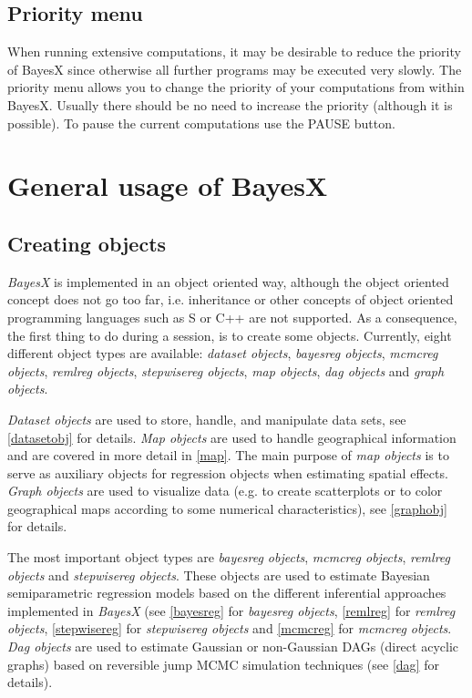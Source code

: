 \subsection{Priority menu}
\label{prioritymenu} 

When running extensive computations, it may be desirable to reduce the priority of BayesX since otherwise all further programs
may be executed very slowly. The priority menu allows you to change the priority of your computations from within BayesX.
Usually there should be no need to increase the priority (although it is possible). To pause the current computations use the
PAUSE button.

\section{General usage of BayesX}
\label{generalusage}

\subsection{Creating objects}
\label{createobject}  

{\em BayesX} is implemented in an object oriented way, although the object oriented concept does not go too far, i.e.
inheritance or other concepts of object oriented programming languages such as S or C++ are not supported. As a consequence,
the first thing to do during a session, is to create some objects. Currently, eight different object types are available: {\em
dataset objects}, {\em bayesreg objects}, {\em mcmcreg objects}, {\em remlreg objects}, {\em stepwisereg objects}, {\em map objects}, {\em dag objects} and {\em graph objects}.

{\em Dataset objects} are used to store, handle, and manipulate data sets, see \autoref{datasetobj} for details. {\em Map
objects} are used to handle geographical information and are covered in more detail in \autoref{map}. The main purpose of {\em
map objects} is to serve as auxiliary objects for regression objects when estimating spatial
effects. {\em Graph objects} are used to visualize data (e.g. to create scatterplots or to color geographical maps according to
some numerical characteristics), see \autoref{graphobj} for details. 

The most important object types are {\em bayesreg objects}, {\em mcmcreg objects}, {\em remlreg objects} and {\em stepwisereg objects}. These objects are used to estimate Bayesian semiparametric regression models based on the different inferential approaches implemented in {\em BayesX} (see \autoref{bayesreg} for {\em bayesreg objects}, \autoref{remlreg} for {\em remlreg objects}, \autoref{stepwisereg} for {\em stepwisereg objects} and \autoref{mcmcreg} for {\em mcmcreg objects}. {\em Dag objects} are used to estimate Gaussian or non-Gaussian DAGs (direct
acyclic graphs) based on reversible jump MCMC simulation techniques (see \autoref{dag} for details).

